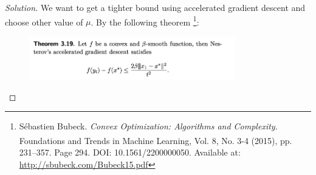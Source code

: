 \documentclass{article}
\newenvironment{solution}
  {\renewcommand\qedsymbol{$\blacksquare$}\begin{proof}[Solution]}
  {\end{proof}}
\begin{document}
\begin{solution}
    



    We want to get a tighter bound using accelerated gradient descent and choose other value of $\mu$. 
    By the following theorem
    \footnote{Sébastien Bubeck. \textit{Convex Optimization: Algorithms and Complexity}. 
    Foundations and Trends\textsuperscript{\textregistered} in Machine Learning, Vol. 8, No. 3-4 (2015), pp. 231–357. Page 294. 
    DOI: 10.1561/2200000050. Available at: \url{http://sbubeck.com/Bubeck15.pdf}}:

    \begin{figure}[H]
        \centering
        \includegraphics[width = 0.8\textwidth]{NAG.png}
    \end{figure}


\end{solution}
\end{document}
